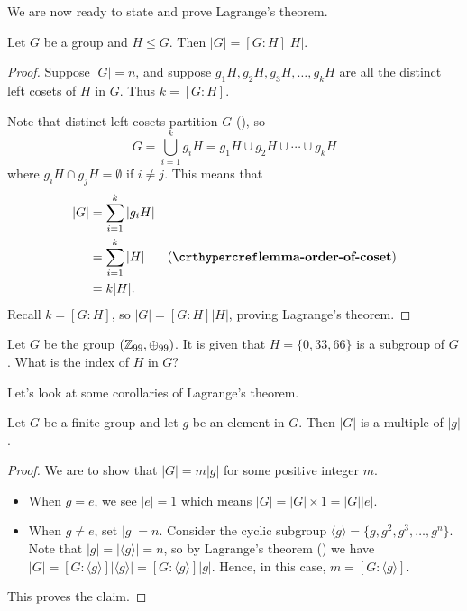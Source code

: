 We are now ready to state and prove Lagrange's theorem.
\begin{theorem}[Lagrange]\label{thrm-lagrange}
    Let $G$ be a group and $H \leq G$. Then $|G| = [G:H]|H|$.
\end{theorem}
\begin{proof}
    Suppose $|G| = n$, and suppose $g_1H, g_2H, g_3H, \dots, g_kH$ are all the distinct left cosets of $H$ in $G$. Thus $k = [G: H]$.

    Note that distinct left cosets partition $G$ (), so
    \[
        G = \bigcup_{i=1}^k g_iH = g_1H \cup g_2H \cup \cdots \cup g_kH
    \]
    where $g_iH \cap g_jH = \emptyset$ if $i \neq j$. This means that
    \begin{align*}
        |G| &= \sum_{i=1}^k|g_iH|\\
        &=\sum_{i=1}^k|H| & (\myref{lemma-order-of-coset})\\
        &= k|H|.
    \end{align*}
    Recall $k = [G: H]$, so $|G| = [G:H]|H|$, proving Lagrange's theorem.
\end{proof}

\begin{exercise}
    Let $G$ be the group $(\mathbb{Z}_{99}, \oplus_{99})$. It is given that $H = \{0, 33, 66\}$ is a subgroup of $G$. What is the index of $H$ in $G$?
\end{exercise}

Let's look at some corollaries of Lagrange's theorem.
\begin{corollary}\label{corollary-order-of-group-multiple-of-order-of-element}
    Let $G$ be a finite group and let $g$ be an element in $G$. Then $|G|$ is a multiple of $|g|$.
\end{corollary}
\begin{proof}
    We are to show that $|G| = m|g|$ for some positive integer $m$.
    \begin{itemize}
        \item When $g = e$, we see $|e| = 1$ which means $|G| = |G| \times 1 = |G||e|$.
        \item When $g \neq e$, set $|g| = n$. Consider the cyclic subgroup $\langle g \rangle = \{g, g^2, g^3, \dots, g^n\}$. Note that $|g| = |\langle g \rangle| = n$, so by Lagrange's theorem () we have $|G| = [G:\langle g \rangle]|\langle g \rangle| = [G:\langle g \rangle]|g|$. Hence, in this case, $m = [G:\langle g \rangle]$.
    \end{itemize}
    This proves the claim.
\end{proof}


